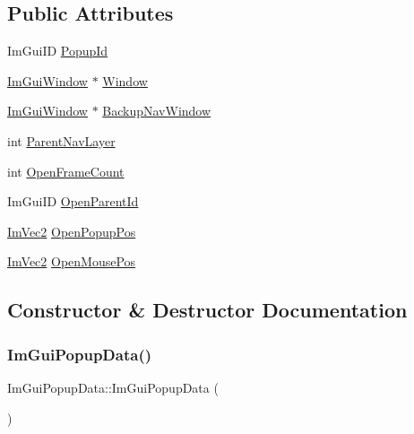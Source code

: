 \subsection*{Public Attributes}
\begin{DoxyCompactItemize}
\item 
Im\+Gui\+ID \hyperlink{structImGuiPopupData_a3cd694871e2313afc9174de18fe76609}{Popup\+Id}
\item 
\hyperlink{structImGuiWindow}{Im\+Gui\+Window} $\ast$ \hyperlink{structImGuiPopupData_ab614c60173f7af6d878122502bd8d87c}{Window}
\item 
\hyperlink{structImGuiWindow}{Im\+Gui\+Window} $\ast$ \hyperlink{structImGuiPopupData_af1a8e6598139994edf1a5747ccd20a01}{Backup\+Nav\+Window}
\item 
int \hyperlink{structImGuiPopupData_ac219865e04d8501f53a6b49a993b7954}{Parent\+Nav\+Layer}
\item 
int \hyperlink{structImGuiPopupData_a31a882f4cd1e73543010c43d056e5edb}{Open\+Frame\+Count}
\item 
Im\+Gui\+ID \hyperlink{structImGuiPopupData_ace5fe62768d9020db88cbba81ca12ad5}{Open\+Parent\+Id}
\item 
\hyperlink{structImVec2}{Im\+Vec2} \hyperlink{structImGuiPopupData_a78925fbd1498d3b92037665535a7a8fc}{Open\+Popup\+Pos}
\item 
\hyperlink{structImVec2}{Im\+Vec2} \hyperlink{structImGuiPopupData_a9d48ffe56872b2e87bc220d619594a55}{Open\+Mouse\+Pos}
\end{DoxyCompactItemize}


\subsection{Constructor \& Destructor Documentation}
\mbox{\label{structImGuiPopupData_a6db95ae57fd86af23cb2f46451bc3b1b}} 
\subsubsection{\texorpdfstring{Im\+Gui\+Popup\+Data()}{ImGuiPopupData()}}
{\footnotesize\ttfamily Im\+Gui\+Popup\+Data\+::\+Im\+Gui\+Popup\+Data (\begin{DoxyParamCaption}{ }\end{DoxyParamCaption})\hspace{0.3cm}{\ttfamily [inline]}}



